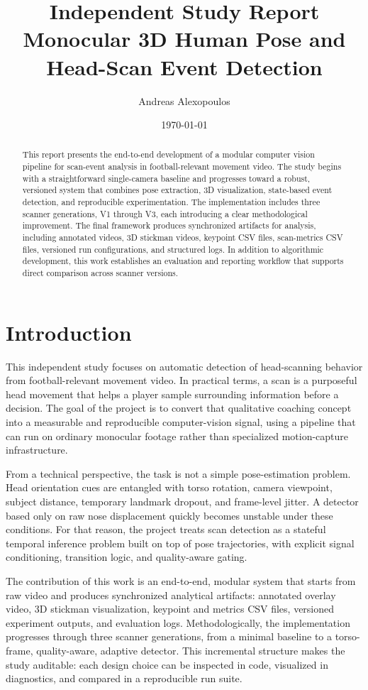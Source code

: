 \documentclass[11pt,a4paper]{article}
\title{Independent Study Report\\
Monocular 3D Human Pose and Head-Scan Event Detection}
\author{Andreas Alexopoulos}
\date{\today}
\begin{document}
\maketitle

\begin{abstract}
This report presents the end-to-end development of a modular computer vision pipeline for scan-event analysis in football-relevant movement video. The study begins with a straightforward single-camera baseline and progresses toward a robust, versioned system that combines pose extraction, 3D visualization, state-based event detection, and reproducible experimentation. The implementation includes three scanner generations, V1 through V3, each introducing a clear methodological improvement. The final framework produces synchronized artifacts for analysis, including annotated videos, 3D stickman videos, keypoint CSV files, scan-metrics CSV files, versioned run configurations, and structured logs. In addition to algorithmic development, this work establishes an evaluation and reporting workflow that supports direct comparison across scanner versions.
\end{abstract}

\tableofcontents
\newpage

\section{Introduction}
This independent study focuses on automatic detection of head-scanning behavior from football-relevant movement video. In practical terms, a scan is a purposeful head movement that helps a player sample surrounding information before a decision. The goal of the project is to convert that qualitative coaching concept into a measurable and reproducible computer-vision signal, using a pipeline that can run on ordinary monocular footage rather than specialized motion-capture infrastructure.

From a technical perspective, the task is not a simple pose-estimation problem. Head orientation cues are entangled with torso rotation, camera viewpoint, subject distance, temporary landmark dropout, and frame-level jitter. A detector based only on raw nose displacement quickly becomes unstable under these conditions. For that reason, the project treats scan detection as a stateful temporal inference problem built on top of pose trajectories, with explicit signal conditioning, transition logic, and quality-aware gating.

The contribution of this work is an end-to-end, modular system that starts from raw video and produces synchronized analytical artifacts: annotated overlay video, 3D stickman visualization, keypoint and metrics CSV files, versioned experiment outputs, and evaluation logs. Methodologically, the implementation progresses through three scanner generations, from a minimal baseline to a torso-frame, quality-aware, adaptive detector. This incremental structure makes the study auditable: each design choice can be inspected in code, visualized in diagnostics, and compared in a reproducible run suite.
\end{document}
